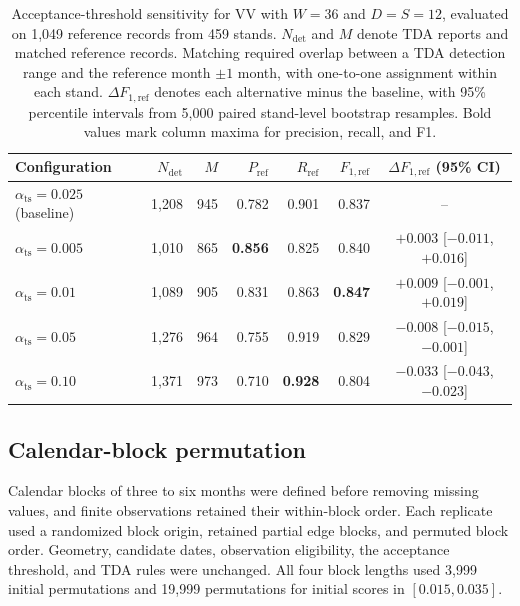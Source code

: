 \documentclass[11pt,a4paper]{article}
\begin{document}
\begin{table}[!htbp]
    \centering\small
    \setlength{\tabcolsep}{3pt}
    \caption{Acceptance-threshold sensitivity for VV with $W=36$ and $D=S=12$, evaluated on 1,049 reference records from 459 stands. $N_{\mathrm{det}}$ and $M$ denote TDA reports and matched reference records. Matching required overlap between a TDA detection range and the reference month $\pm1$ month, with one-to-one assignment within each stand. $\Delta F_{1,\mathrm{ref}}$ denotes each alternative minus the baseline, with 95\% percentile intervals from 5,000 paired stand-level bootstrap resamples. Bold values mark column maxima for precision, recall, and F1.}
    \label{tab:si_acceptance_threshold}
    \begin{tabular*}{\linewidth}{@{\extracolsep{\fill}}lrrrrrc@{}}
        \toprule
        Configuration & $N_{\mathrm{det}}$ & $M$ & $P_{\mathrm{ref}}$ & $R_{\mathrm{ref}}$ & $F_{1,\mathrm{ref}}$ & $\Delta F_{1,\mathrm{ref}}$ (95\% CI) \\
        \midrule
        $\alpha_{\mathrm{ts}}=0.025$ (baseline) & 1,208 & 945 & 0.782 & 0.901 & 0.837 & -- \\
        \midrule
        $\alpha_{\mathrm{ts}}=0.005$ & 1,010 & 865 & \textbf{0.856} & 0.825 & 0.840 & $+0.003$ [$-0.011$, $+0.016$] \\
        $\alpha_{\mathrm{ts}}=0.01$ & 1,089 & 905 & 0.831 & 0.863 & \textbf{0.847} & $+0.009$ [$-0.001$, $+0.019$] \\
        $\alpha_{\mathrm{ts}}=0.05$ & 1,276 & 964 & 0.755 & 0.919 & 0.829 & $-0.008$ [$-0.015$, $-0.001$] \\
        $\alpha_{\mathrm{ts}}=0.10$ & 1,371 & 973 & 0.710 & \textbf{0.928} & 0.804 & $-0.033$ [$-0.043$, $-0.023$] \\
        \bottomrule
    \end{tabular*}
\end{table}

\subsection{Calendar-block permutation}

Calendar blocks of three to six months were defined before removing missing values, and finite observations retained their within-block order. Each replicate used a randomized block origin, retained partial edge blocks, and permuted block order. Geometry, candidate dates, observation eligibility, the acceptance threshold, and TDA rules were unchanged. All four block lengths used 3,999 initial permutations and 19,999 permutations for initial scores in $[0.015,0.035]$.
\end{document}
